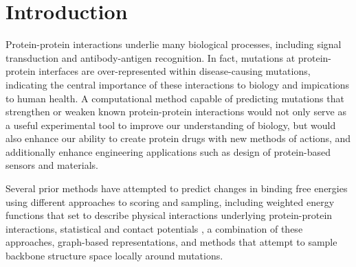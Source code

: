 \section{Introduction}

Protein-protein interactions underlie many biological processes, including signal transduction and antibody-antigen recognition.
In fact, mutations at protein-protein interfaces are over-represented within disease-causing mutations\cite{jubb_mutations_2017}, indicating the central importance of these interactions to biology and impications to human health.
A computational method capable of predicting mutations that strengthen or weaken known protein-protein interactions would not only serve as a useful experimental tool to improve our understanding of biology, but would also enhance our ability to create protein drugs with new methods of actions, and additionally enhance engineering applications such as design of protein-based sensors and materials.

Several prior methods have attempted to predict changes in binding free energies using different approaches to scoring and sampling,
including weighted energy functions that set to describe physical interactions underlying protein-protein interactions\cite{guerois_predicting_2002,kamisetty_accounting_2011},
statistical and contact potentials \cite{dehouck_beatmusic:_2013,moal_intermolecular_2013,vangone_contacts-based_2015,brender_prediction_2015},
a combination of these approaches\cite{li_predicting_2014},
graph-based representations\cite{pires_mcsm:_2014},
and methods that attempt to sample backbone structure space locally around mutations\cite{dourado_multiscale_2014}.

